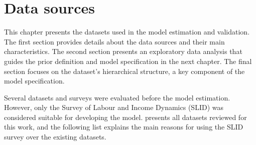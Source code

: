 \chapter{Data sources}

This chapter presents the datasets used in the model estimation and validation. The first section provides details about the data sources and their main characteristics. The second section presents an exploratory data analysis that guides the prior definition and model specification in the next chapter. The final section focuses on the dataset's hierarchical structure, a key component of the model specification. 

Several datasets and surveys were evaluated before the model estimation. However, only the Survey of Labour and Income Dynamics (SLID) was considered suitable for developing the model.  presents all datasets reviewed for this work, and the following list explains the main reasons for using the SLID survey over the existing datasets. 

